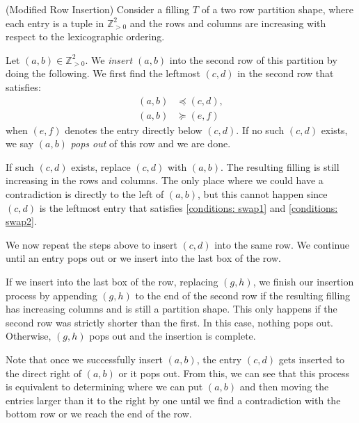 \documentclass[10pt]{amsart}
\theoremstyle{plain}
\theoremstyle{definition}
\theoremstyle{plain}
\theoremstyle{plain}
\theoremstyle{remark}
\theoremstyle{plain}
\theoremstyle{plain}
\begin{document}
\begin{alg}\label{alg: insertion} (Modified Row Insertion)
Consider a filling $T$ of a two row partition shape, where each entry is a tuple in $\mathbb{Z}^2_{>0}$ and the rows and columns are increasing with respect to the lexicographic ordering. 

Let $(a,b) \in \mathbb{Z}^2_{>0}$. We \textit{insert $(a,b)$} into the second row of this partition by doing the following.
We first find the leftmost $(c,d)$ in the second row that satisfies:
\begin{align}
        (a,b) & \preceq (c,d) \label{conditions: swap1},\\ (a,b) & \succeq (e,f)\label{conditions: swap2}
\end{align}
when $(e,f)$ denotes the entry directly below $(c,d)$.
If no such $(c,d)$ exists, we say $(a,b)$ \textit{pops out} of this row and we are done. 

If such $(c,d)$ exists, replace $(c,d)$ with $(a,b)$. The resulting filling is still increasing in the rows and columns. 
The only place where we could have a contradiction is directly to the left of $(a,b)$, but this cannot happen since $(c,d)$ is the leftmost entry that satisfies \eqref{conditions: swap1} and \eqref{conditions: swap2}.

We now repeat the steps above to insert $(c,d)$ into the same row. We continue until an entry pops out or we insert into the last box of the row. 

If we insert into the last box of the row, replacing $(g,h)$, we finish our insertion process by appending $(g,h)$ to the end of the second row if the resulting filling has increasing columns and is still a partition shape. This only happens if the second row was strictly shorter than the first. In this case, nothing pops out.
Otherwise, $(g,h)$ pops out and the insertion is complete. 

Note that once we successfully insert $(a,b)$, the entry $(c,d)$ gets inserted to the direct right of $(a,b)$ or it pops out. 
From this, we can see that this process is equivalent to determining where we can put $(a,b)$ and then moving the entries larger than it to the right by one until we find a contradiction with the bottom row or we reach the end of the row. 
\end{alg}
\end{document}
